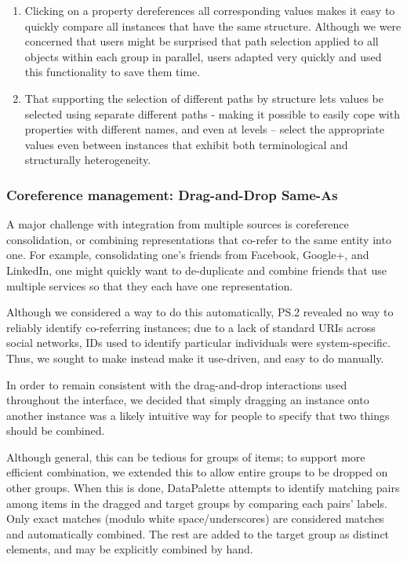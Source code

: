 \documentclass{sigchi}
\begin{document}
\begin{enumerate}
\item Clicking on a property dereferences all corresponding values makes it easy to quickly compare all instances that have the same structure.  Although we were concerned that users might be surprised that path selection applied to all objects within each group in parallel, users adapted very quickly and used this functionality to save them time.   

\item That supporting the selection of different paths by structure lets values be selected using separate different paths - making it possible to easily cope with properties with different names, and even at levels -- select the appropriate values even between instances that exhibit both  terminological and structurally heterogeneity.
\end{enumerate}

 

\subsubsection{Coreference management: Drag-and-Drop Same-As}

A major challenge with integration from multiple sources is coreference consolidation, or combining representations that co-refer to the same entity into one.  For example, consolidating one's friends from Facebook, Google+, and LinkedIn, one might quickly want to de-duplicate and combine friends that use multiple services so that they each have one representation.

Although we considered a way to do this automatically, PS.2 revealed no way to reliably identify co-referring instances; due to a lack of standard URIs across social networks, IDs used to identify particular individuals were system-specific.  Thus, we sought to make instead make it use-driven, and easy to do manually.  

In order to remain consistent with the drag-and-drop interactions used throughout the interface, we decided that simply dragging an instance onto another instance was a likely intuitive way for people to specify that two things should be combined.  

Although general, this can be tedious for groups of items; to support more efficient combination, we extended this to allow entire groups to be dropped on other groups.  When this is done, DataPalette attempts to identify matching pairs among items in the dragged and target groups by comparing each pairs' labels.  Only exact matches (modulo white space/underscores) are considered matches and automatically combined.  The rest are added to the target group as distinct elements, and may be explicitly combined by hand.
\end{document}
